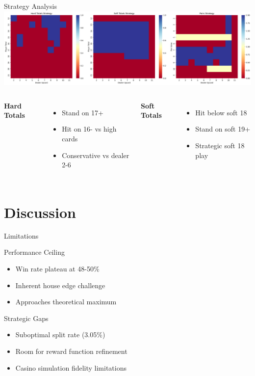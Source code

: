 \documentclass{beamer}
\begin{document}
\begin{frame}{Strategy Analysis}
    \includegraphics[width=\textwidth]{./images/agent_strategy.png}
    
    \begin{columns}
        \textbf{Hard Totals}
        \begin{itemize}
            \item Stand on 17+
            \item Hit on 16- vs high cards
            \item Conservative vs dealer 2-6
        \end{itemize}
        
        \textbf{Soft Totals}
        \begin{itemize}
            \item Hit below soft 18
            \item Stand on soft 19+
            \item Strategic soft 18 play
        \end{itemize}
    \end{columns}
\end{frame}

\section{Discussion}

\begin{frame}{Limitations}
    \begin{block}{Performance Ceiling}
        \begin{itemize}
            \item Win rate plateau at 48-50\%
            \item Inherent house edge challenge
            \item Approaches theoretical maximum
        \end{itemize}
    \end{block}
    
    \begin{block}{Strategic Gaps}
        \begin{itemize}
            \item Suboptimal split rate (3.05\%)
            \item Room for reward function refinement
            \item Casino simulation fidelity limitations
        \end{itemize}
    \end{block}
\end{frame}
\end{document}
